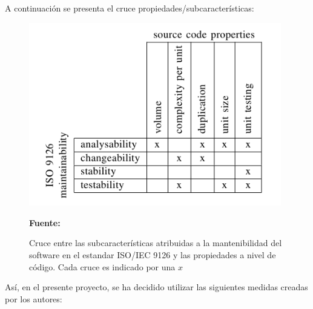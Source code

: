 A continuación se presenta el cruce propiedades/subcaracterísticas:

\begin{figure}[!htb]
  \begin{center}
    \includegraphics[width=11cm]{./imagenes/mantainability1.png}
    \caption{Cruce entre las subcaracterísticas atribuidas a la mantenibilidad del software en el estandar ISO/IEC 9126 y las propiedades a nivel de código. Cada cruce es indicado por una $x$}
    \label{fig:mantainability1}
    \textbf{Fuente:}  \cite{measuring_maintainability}
  \end{center}
\end{figure}

Así, en el presente proyecto, se ha decidido utilizar las siguientes medidas creadas por los autores:


